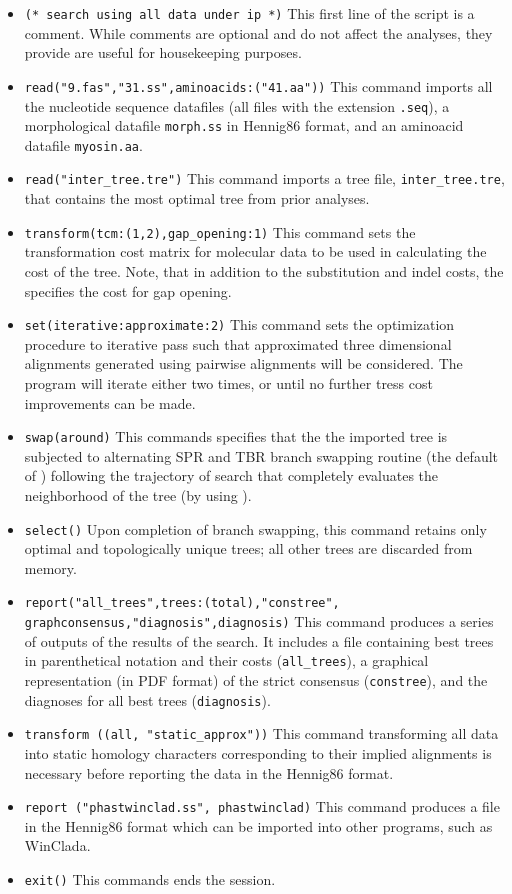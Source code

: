 \begin{itemize}
\item \texttt{(* search using all data under ip *)} This first line of the script is a comment. While comments are optional and do not affect the analyses, they provide are useful for housekeeping purposes.
\item \texttt{read("9.fas","31.ss",aminoacids:("41.aa"))} This command imports all the nucleotide sequence datafiles (all files with the extension \texttt{.seq}), a morphological datafile \texttt{morph.ss} in Hennig86 format, and an aminoacid datafile \texttt{myosin.aa}.
\item \texttt{read("inter\_tree.tre")} This command imports a tree file, \texttt{inter\_tree.tre}, that contains the most optimal tree from prior analyses. 
\item \texttt{transform(tcm:(1,2),gap\_opening:1)} This command sets the transformation cost matrix for molecular data to be used in calculating the cost of the tree. Note, that in addition to the substitution and indel costs, the  specifies the cost for gap opening.
\item \texttt{set(iterative:approximate:2)} This command sets the optimization procedure
    to iterative pass such that approximated three dimensional alignments generated using pairwise alignments will be considered.  The program will iterate either two times, or until no further tress cost improvements can be made.
\item \texttt{swap(around)} This commands specifies that the the imported tree is subjected to alternating SPR and TBR branch swapping routine (the default of \poy) following the trajectory of search that completely evaluates the neighborhood of the tree (by using ).
\item \texttt{select()} Upon completion of branch swapping, this command retains only optimal and topologically unique trees; all other trees are discarded from memory.
\item \texttt{report("all\_trees",trees:(total),"constree",\\graphconsensus,"diagnosis",diagnosis)} This command produces a series of outputs of the results of the search. It includes a file containing best trees in parenthetical notation and their costs (\texttt{all\_trees}), a graphical representation (in PDF format) of the strict consensus (\texttt{constree}), and the diagnoses for all best trees (\texttt{diagnosis}).
\item \texttt{transform ((all, "static\_approx"))} This command transforming all data into static homology characters corresponding to their implied alignments is necessary before reporting the data in the Hennig86 format.
\item \texttt{report ("phastwinclad.ss", phastwinclad)}  This command produces a file in the Hennig86 format which can be imported into other programs, such as WinClada.
\item \texttt{exit()} This commands ends the \poy session.
\end{itemize}

